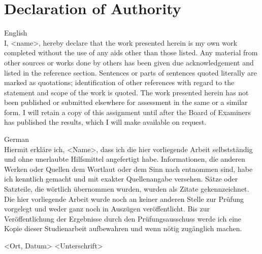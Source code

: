 \chapter*{Declaration of Authority}
English\\
I, <name>, hereby declare that the work presented herein is my own work
completed without the use of any aids other than those listed. Any material
from other sources or works done by others has been given due
acknowledgement and listed in the reference section. Sentences or parts of
sentences quoted literally are marked as quotations; identification of other
references with regard to the statement and scope of the work is quoted.
The work presented herein has not been published or submitted elsewhere
for assessment in the same or a similar form. I will retain a copy of this
assignment until after the Board of Examiners has published the results,
which I will make available on request.

German\\
Hiermit erkläre ich, <Name>, dass ich die hier vorliegende Arbeit selbstständig
und ohne unerlaubte Hilfsmittel angefertigt habe. Informationen, die
anderen Werken oder Quellen dem Wortlaut oder dem Sinn nach entnommen
sind, habe ich kenntlich gemacht und mit exakter Quellenangabe
versehen. Sätze oder Satzteile, die wörtlich übernommen wurden, wurden
als Zitate gekennzeichnet. Die hier vorliegende Arbeit wurde noch an
keiner anderen Stelle zur Prüfung vorgelegt und weder ganz noch in
Auszügen veröffentlicht. Bis zur Veröffentlichung der Ergebnisse durch den
Prüfungsausschuss werde ich eine Kopie dieser Studienarbeit aufbewahren
und wenn nötig zugänglich machen.

<Ort, Datum> <Unterschrift>

\backmatter